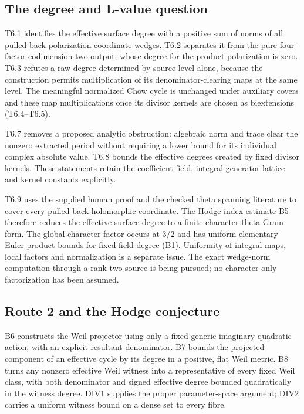 \documentclass[11pt,a4paper]{article}
\theoremstyle{definition}
\begin{document}
\subsection{The degree and L-value
question}\label{the-degree-and-l-value-question}

T6.1 identifies the effective surface degree with a positive sum of
norms of all pulled-back polarization-coordinate wedges. T6.2 separates
it from the pure four-factor codimension-two output, whose degree for
the product polarization is zero. T6.3 refutes a raw degree determined
by source level alone, because the construction permits multiplication
of its denominator-clearing maps at the same level. The meaningful
normalized Chow cycle is unchanged under auxiliary covers and these map
multiplications once its divisor kernels are chosen as biextensions
(T6.4--T6.5).

T6.7 removes a proposed analytic obstruction: algebraic norm and trace
clear the nonzero extracted period without requiring a lower bound for
its individual complex absolute value. T6.8 bounds the effective degrees
created by fixed divisor kernels. These statements retain the
coefficient field, integral generator lattice and kernel constants
explicitly.

T6.9 uses the supplied human proof and the checked theta spanning
literature to cover every pulled-back holomorphic coordinate. The
Hodge-index estimate B5 therefore reduces the effective surface degree
to a finite character-theta Gram form. The global character factor
occurs at 3/2 and has uniform elementary Euler-product bounds for fixed
field degree (B1). Uniformity of integral maps, local factors and
normalization is a separate issue. The exact wedge-norm computation
through a rank-two source is being pursued; no character-only
factorization has been assumed.

\subsection{Route 2 and the Hodge
conjecture}\label{route-2-and-the-hodge-conjecture}

B6 constructs the Weil projector using only a fixed generic imaginary
quadratic action, with an explicit resultant denominator. B7 bounds the
projected component of an effective cycle by its degree in a positive,
flat Weil metric. B8 turns any nonzero effective Weil witness into a
representative of every fixed Weil class, with both denominator and
signed effective degree bounded quadratically in the witness degree.
DIV1 supplies the proper parameter-space argument; DIV2 carries a
uniform witness bound on a dense set to every fibre.
\end{document}
